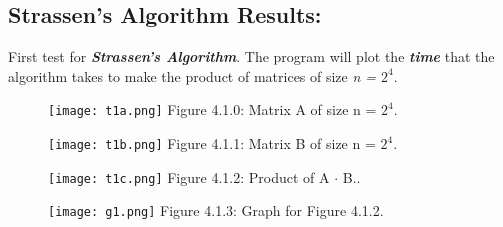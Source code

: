 \subsection{Strassen's Algorithm Results:}

First test for {\bfseries\itshape Strassen's Algorithm}. The program will plot the {\bfseries\itshape time} that the algorithm takes to make the product of matrices of size {\itshape  n = $2^{4}$}. \hfill \break

{\bfseries\itshape\color{carmine}{Observation:}} {\itshape\color{carmine}{This algorithm has the same complexity always, that is because doesn't has worst or best case.}} \hfill \break

\begin{multicols}{2}
\begin{figure}[H]
\texttt{[image: t1a.png]}
\centering \linebreak \linebreak Figure 4.1.0: Matrix A of size n = $2^{4}$.
\end{figure} \hfill 

\begin{figure}[H]
\texttt{[image: t1b.png]}
\centering \linebreak \linebreak Figure 4.1.1: Matrix B of size n = $2^{4}$.
\end{figure} 
\end{multicols}

\begin{figure}[H]
\texttt{[image: t1c.png]}
\centering \linebreak \linebreak Figure 4.1.2: Product of A $\cdot$ B..
\end{figure} 

\pagebreak

\begin{figure}[H]
\texttt{[image: g1.png]}
\centering \linebreak \linebreak Figure 4.1.3: Graph for Figure 4.1.2.
\end{figure} \hfill

{\bfseries\itshape\color{carmine}{Observation:}} {\itshape{}} \hfill \break

